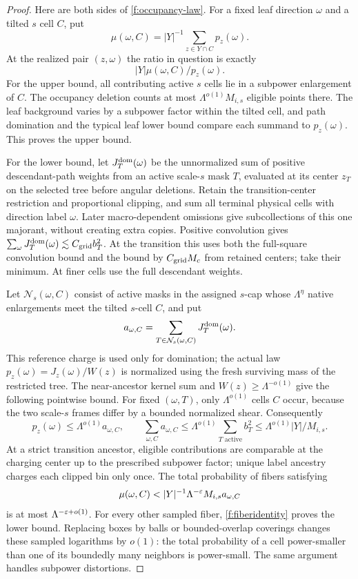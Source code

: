 \begin{proof}
Here are both sides of \eqref{f:occupancy-law}. For a fixed leaf
direction $\omega$ and a tilted $s$ cell $C$, put
\[
 \mu(\omega,C)=|Y|^{-1}\sum_{z\in Y\cap C}p_z(\omega).
\]
At the realized pair $(z,\omega)$ the ratio in question is exactly
\begin{equation}\label{f:fiberidentity}
 |Y|\mu(\omega,C)/p_z(\omega).
\end{equation}
For the upper bound, all contributing active $s$ cells lie in a
subpower enlargement of $C$. The occupancy deletion counts at most
$\Lambda^{o(1)}M_{i,s}$ eligible points there. The leaf background
varies by a subpower factor within the tilted cell, and path
domination and the typical leaf lower bound compare each summand
to $p_z(\omega)$. This proves the upper bound.

For the lower bound, let $J_T^{\rm dom}(\omega)$ be the
unnormalized sum of positive descendant-path weights from an active
scale-$s$ mask $T$, evaluated at its center $z_T$ on the selected tree
before angular deletions.
Retain the transition-center restriction and proportional clipping,
and sum all terminal physical cells with direction label $\omega$.
Later macro-dependent omissions give subcollections of this one
majorant, without creating extra copies. Positive convolution gives
$\sum_\omega J_T^{\rm dom}(\omega)\lesssim C_{\rm grid}b_T^2$.
At the transition this uses both the full-square convolution bound
and the bound by $C_{\rm grid}M_c$ from retained centers; take their
minimum. At finer cells use the full descendant weights.

Let $\mathcal N_s(\omega,C)$ consist of active masks in the assigned
$s$-cap whose $\Lambda^\eta$ native enlargements meet the tilted
$s$-cell $C$, and put
\[
 a_{\omega,C}=\sum_{T\in\mathcal N_s(\omega,C)}J_T^{\rm dom}(\omega).
\]
This reference charge is used only for domination; the actual law
$p_z(\omega)=J_z(\omega)/W(z)$ is normalized using the fresh surviving
mass of the restricted tree.
The near-ancestor kernel sum and $W(z)\ge\Lambda^{-o(1)}$ give the
following pointwise bound. For fixed $(\omega,T)$, only
$\Lambda^{o(1)}$ cells $C$ occur, because the two scale-$s$ frames
differ by a bounded normalized shear. Consequently
\[
 p_z(\omega)\le\Lambda^{o(1)}a_{\omega,C},\qquad
 \sum_{\omega,C}a_{\omega,C}
 \le\Lambda^{o(1)}\sum_{T\text{ active}}b_T^2
 \le\Lambda^{o(1)}|Y|/M_{i,s}.
\]
At a strict transition ancestor, eligible contributions are comparable
at the charging center up to the prescribed subpower factor; unique
label ancestry charges each clipped bin only once.
The total probability of fibers satisfying
\[
 \mu(\omega,C)<|Y|^{-1}\Lambda^{-\eps}M_{i,s}a_{\omega,C}
\]
is at most $\Lambda^{-\varepsilon+o(1)}$. For every other sampled fiber,
\eqref{f:fiberidentity} proves the lower bound. Replacing boxes by
balls or bounded-overlap coverings changes these sampled logarithms
by $o(1)$: the total probability of a cell power-smaller than one
of its boundedly many neighbors is power-small. The same argument
handles subpower distortions.
\end{proof}

